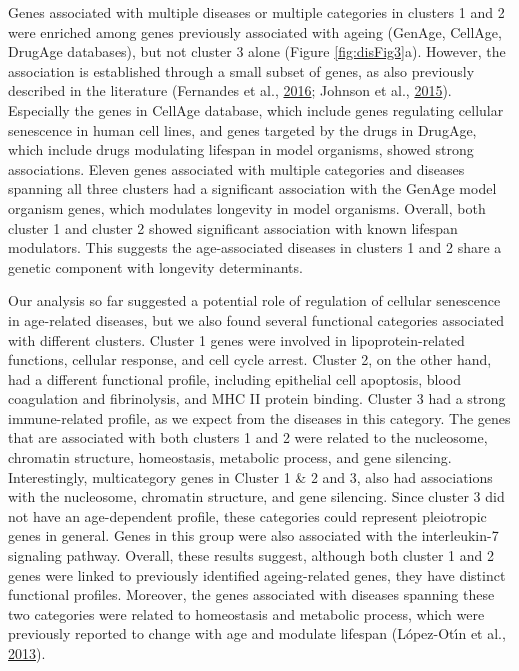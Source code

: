 \documentclass[12pt,twoside]{unicam}
\begin{document}
Genes associated with multiple diseases or multiple categories in clusters 1 and 2 were enriched among genes previously associated with ageing (GenAge, CellAge, DrugAge databases), but not cluster 3 alone (Figure \ref{fig:disFig3}a). However, the association is established through a small subset of genes, as also previously described in the literature (Fernandes et al., \protect\hyperlink{ref-Fernandes2016}{2016}; Johnson et al., \protect\hyperlink{ref-Johnson2015}{2015}). Especially the genes in CellAge database, which include genes regulating cellular senescence in human cell lines, and genes targeted by the drugs in DrugAge, which include drugs modulating lifespan in model organisms, showed strong associations. Eleven genes associated with multiple categories and diseases spanning all three clusters had a significant association with the GenAge model organism genes, which modulates longevity in model organisms. Overall, both cluster 1 and cluster 2 showed significant association with known lifespan modulators. This suggests the age-associated diseases in clusters 1 and 2 share a genetic component with longevity determinants.

Our analysis so far suggested a potential role of regulation of cellular senescence in age-related diseases, but we also found several functional categories associated with different clusters. Cluster 1 genes were involved in lipoprotein-related functions, cellular response, and cell cycle arrest. Cluster 2, on the other hand, had a different functional profile, including epithelial cell apoptosis, blood coagulation and fibrinolysis, and MHC II protein binding. Cluster 3 had a strong immune-related profile, as we expect from the diseases in this category. The genes that are associated with both clusters 1 and 2 were related to the nucleosome, chromatin structure, homeostasis, metabolic process, and gene silencing. Interestingly, multicategory genes in Cluster 1 \& 2 and 3, also had associations with the nucleosome, chromatin structure, and gene silencing. Since cluster 3 did not have an age-dependent profile, these categories could represent pleiotropic genes in general. Genes in this group were also associated with the interleukin-7 signaling pathway. Overall, these results suggest, although both cluster 1 and 2 genes were linked to previously identified ageing-related genes, they have distinct functional profiles. Moreover, the genes associated with diseases spanning these two categories were related to homeostasis and metabolic process, which were previously reported to change with age and modulate lifespan (López-Otı́n et al., \protect\hyperlink{ref-Lopez-Otin2013}{2013}).
\end{document}
